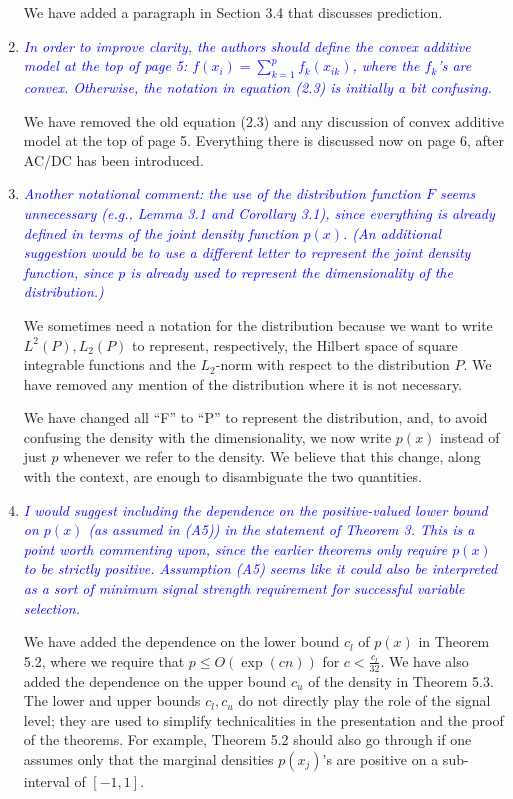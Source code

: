 \documentclass[pdftex,12pt]{article}
\def\rc#1{{\it\textcolor{blue}{#1}}\smallskip}
\begin{document}
\begin{enumerate}[(1)]
We have added a paragraph in Section 3.4 that discusses prediction. 

\item \rc{In order to improve clarity, the authors should define the convex
additive model at the top of page 5: $f(x_i) = \sum_{k=1}^p f_k(x_{ik})$, where the
$f_k$'s are convex.  Otherwise, the notation in equation (2.3) is
initially a bit confusing.}

We have removed the old equation (2.3) and any discussion of convex additive model at the top of page 5. Everything there is discussed now on page 6, after AC/DC has been introduced.

\item \rc{Another notational comment: the use of the
distribution function $F$ seems unnecessary (e.g., Lemma 3.1 and
Corollary 3.1), since everything is already defined in terms of the
joint density function $p(x)$. (An additional suggestion would be to use
a different letter to represent the joint density function, since $p$ is
already used to represent the dimensionality of the distribution.)}

We sometimes need a notation for the distribution because we want to write $L^2(P), L_2(P)$ to represent, respectively, the Hilbert space of square integrable functions and the $L_2$-norm with respect to the distribution $P$. We have removed any mention of the distribution where it is not necessary.

We have changed all ``F'' to ``P'' to represent the distribution, and, to avoid confusing the density with the dimensionality, we now write $p(x)$ instead of just $p$ whenever we refer to the density. We believe that this change, along with the context, are enough to disambiguate the two quantities. 

\item \rc{I would suggest including the dependence on the positive-valued lower
bound on $p(x)$ (as assumed in (A5)) in the statement of Theorem 3. This
is a point worth commenting upon, since the earlier theorems only
require $p(x)$ to be strictly positive. Assumption (A5) seems like it
could also be interpreted as a sort of minimum signal strength
requirement for successful variable selection.}

We have added the dependence on the lower bound $c_l$ of $p(x)$ in Theorem 5.2, where we require that $p \leq O(\exp(cn))$ for $c < \frac{c_l}{32}$. We have also added the dependence on the upper bound $c_u$ of the density in Theorem 5.3. The lower and upper bounds $c_l, c_u$ do not directly play the role of the signal level; they are used to simplify technicalities in the presentation and the proof of the theorems. For example, Theorem 5.2 should also go through if one assumes only that the marginal densities $p(x_j)$'s are positive on a sub-interval of $[-1,1]$. 


\end{enumerate}
\end{document}
